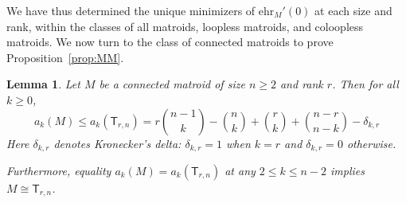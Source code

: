 \documentclass[pagesize,paper=A4,11pt,bibliography=totoc,oneside]{scrartcl}
\newtheorem{lemma}[thm]{Lemma}
\newcommand{\MM}[2]{\mathsf{T}_{#2,#1}} %
\newcommand{\ehr}{\mathrm{ehr}}
\begin{document}
We have thus determined the unique minimizers of $\ehr_M'(0)$ at each size and rank, within the classes of all matroids, loopless matroids, and coloopless matroids. We now turn to the class of connected matroids to prove Proposition~\ref{prop:MM}.
\begin{lemma}\label{lem:upper-conn}
    Let $M$ be a connected matroid of size $n\geq2$ and rank $r$. Then for all $k\geq0$,
    \begin{equation*}
        a_k(M)\leq a_k(\MM{n}{r})=r\binom{n-1}{k}-\binom{n}{k}+\binom{r}{k}+\binom{n-r}{n-k}-\delta_{k,r}
    \end{equation*}
    Here $\delta_{k,r}$ denotes Kronecker's delta: $\delta_{k,r}=1$ when $k=r$ and $\delta_{k,r}=0$ otherwise.
    
    Furthermore, equality $a_k(M)=a_k(\MM{n}{r})$ at any $2\leq k\leq n-2$ implies $M\cong\MM{n}{r}$.
\end{lemma}
\end{document}
